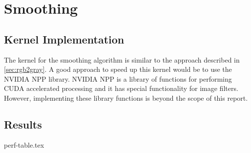 \documentclass[final]{report}
\begin{document}
\chapter{Smoothing}

\section{Kernel Implementation}
The kernel for the smoothing algorithm is similar to the approach described in \cref{sec:rgb2gray}.
A good approach to speed up this kernel would be to use the NVIDIA NPP library.
NVIDIA NPP is a library of functions for performing CUDA accelerated processing and it has special functionality for image filters.
However, implementing these library functions is beyond the scope of this report.

\section{Results}
{perf-table.tex}

\end{document}
